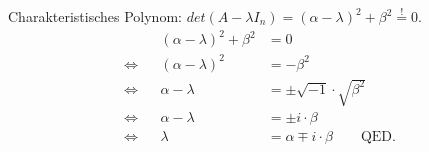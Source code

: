 \documentclass[12pt]{article}
\begin{document}
\begin{enumerate}
          \begin{solution}
              Charakteristisches Polynom: $det(A-\lambda I_n) = (\alpha - \lambda)^2 +\beta^2 \stackrel{!}{=} 0$.\\
              \vspace*{-0.25cm}
              \begin{align*}
                       &  & \left(\alpha-\lambda\right)^2 + \beta^2 & = 0                                          \\
                  \iff &  & \left(\alpha-\lambda\right)^2           & = -\beta^2                                   \\
                  \iff &  & \alpha-\lambda                          & = \pm \sqrt{-1} \cdot \sqrt{\beta^2}         \\
                  \iff &  & \alpha-\lambda                          & = \pm i\cdot \beta                           \\
                  \iff &  & \lambda                                 & = \alpha \mp i\cdot \beta \qquad \text{QED.}
              \end{align*}
          \end{solution}

\end{enumerate}
\pagebreak

\newcommand{\raphsonFunction}{
    $f(x_1,x_2) =
        \begin{bmatrix}
            x_1^2 - x_2 \\ x_1x_2^2 + x_2
        \end{bmatrix}$}

\newcommand{\raphsonStartVal}{
    $\begin{bmatrix}x_{10} \\ x_{20}\end{bmatrix}
        =
        \begin{bmatrix}1\\ -1\end{bmatrix}$}
\end{document}
